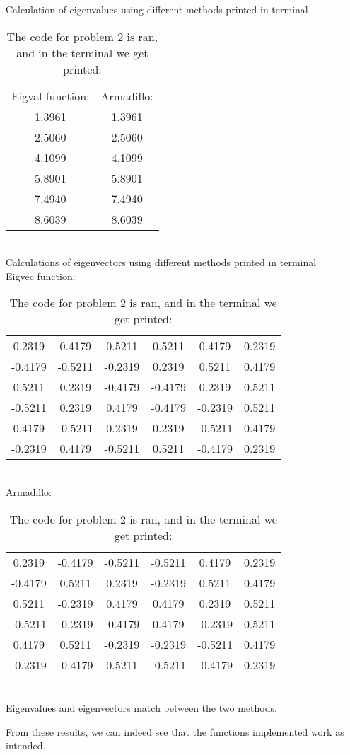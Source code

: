 \documentclass{article} %
\begin{document}
  \begin{table} [h!]
    \centering
    \caption{The code for problem 2 is ran, and in the terminal we get printed:}
    \hline
    Calculation of eigenvalues using different methods printed in terminal \\
    \begin{tabular}{c c}
      Eigval function: & Armadillo: \\
      1.3961 & 1.3961 \\
      2.5060 & 2.5060 \\
      4.1099 & 4.1099 \\
      5.8901 & 5.8901 \\
      7.4940 & 7.4940 \\
      8.6039 & 8.6039 \\
      \hline
    \end{tabular}\label{tab:midpointruletab}
    \\
    Calculations of eigenvectors using different methods printed in terminal \\
    Eigvec function: \\
    \begin{tabular}{c c c c c c}
      0.2319 &   0.4179  &  0.5211  &  0.5211  &  0.4179  &  0.2319 \\
      -0.4179  & -0.5211 &  -0.2319  &  0.2319 &   0.5211  &  0.4179 \\
      0.5211  &  0.2319 &  -0.4179 &  -0.4179  &  0.2319  &  0.5211 \\
      -0.5211 &   0.2319  &  0.4179 &  -0.4179 &  -0.2319 &   0.5211 \\
      0.4179 &  -0.5211  &  0.2319  &  0.2319 &  -0.5211  &  0.4179 \\
      -0.2319  &  0.4179 &  -0.5211 &   0.5211 &  -0.4179  &  0.2319 \\
      \hline
    \end{tabular}\label{tab:midpointruletab}
    \\
    Armadillo: \\
    \begin{tabular}{c c c c c c}
      0.2319  & -0.4179 &  -0.5211  & -0.5211 &   0.4179 &   0.2319 \\
      -0.4179 &   0.5211 &   0.2319 &  -0.2319  &  0.5211 &   0.4179 \\
      0.5211  & -0.2319  &  0.4179  &  0.4179 &   0.2319 &   0.5211 \\
      -0.5211  & -0.2319 &  -0.4179 &   0.4179 &  -0.2319  &  0.5211 \\
      0.4179  &  0.5211 &   -0.2319  & -0.2319  & -0.5211 &   0.4179 \\
      -0.2319 &  -0.4179  &  0.5211 &  -0.5211 &  -0.4179 &   0.2319 \\
      \hline
    \end{tabular}\label{tab:midpointruletab}
    \\

    Eigenvalues and eigenvectors match between the two methods. \\
  \end{table}
  From these results, we can indeed see that the functions implemented work as intended. 
  
\end{document}
